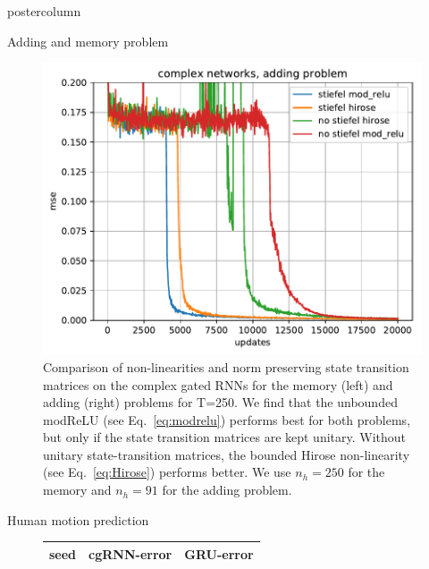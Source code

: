 \documentclass{beamer}
\begin{document}
\begin{frame}
\begin{columns}
\begin{column}{.57\textwidth}
\begin{beamercolorbox}[center]{postercolumn}
\begin{minipage}{.98\textwidth}
{\begin{myblock}{Adding and memory problem}
\begin{figure}
\begin{minipage}{0.43\textwidth}
                            \end{minipage}
                            \hspace{1em}
                            \begin{minipage}{0.45\textwidth}
                                \centering\includegraphics{img/adding_c.pdf}
                            \end{minipage}
                            \caption{Comparison of non-linearities and norm preserving state transition matrices on the complex gated RNNs for the memory (left) and adding (right) problems for T=250.  We find that the unbounded modReLU (see Eq.~\ref{eq:modrelu}) performs best for both problems, but only if the state transition matrices are kept unitary.  Without unitary state-transition matrices, the bounded Hirose non-linearity (see Eq.~\ref{eq:Hirose}) performs better. We use $n_h=250$ for the memory and $n_h=91$ for the adding problem.}
                        \end{figure}
                    \end{myblock}\vfill
                    \begin{myblock}{Human motion prediction}
                        \begin{figure}
                        \centering
                            \begin{minipage}{0.25\textwidth}
                                \scriptsize
                                \begin{tabular}{|c|c|c|}\hline
                                    seed     &   cgRNN-error                    & GRU-error                      \\ \hline

\end{tabular}
\end{minipage}
\end{figure}
\end{myblock}}
\end{minipage}
\end{beamercolorbox}
\end{column}
\end{columns}
\end{frame}
\end{document}

